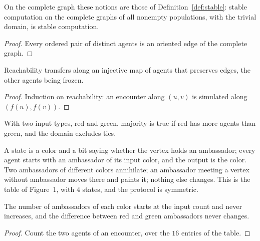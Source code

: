\begin{lemma}\label{lem:graph-top}
\leanok{}
On the complete graph these notions are those of Definition~\ref{def:stable}: stable
computation on the complete graphs of all nonempty populations, with the trivial domain, is
stable computation.
\end{lemma}
\begin{proof}\leanok
Every ordered pair of distinct agents is an oriented edge of the complete graph.
\end{proof}

\begin{lemma}\label{lem:graph-extend}
\leanok{}
Reachability transfers along an injective map of agents that preserves edges, the other agents
being frozen.
\end{lemma}
\begin{proof}\leanok
Induction on reachability: an encounter along $(u, v)$ is simulated along $(f(u), f(v))$.
\end{proof}

\begin{definition}[Majority]\label{def:majority}
\leanok{}
With two input types, red and green, majority is true if red has more agents than green, and the
domain excludes ties.
\end{definition}

\begin{definition}\label{def:ambassador}
\leanok{}
A state is a color and a bit saying whether the vertex holds an ambassador; every agent starts
with an ambassador of its input color, and the output is the color. Two ambassadors of different
colors annihilate; an ambassador meeting a vertex without ambassador moves there and paints it;
nothing else changes. This is the table of Figure~1, with $4$ states, and the protocol is
symmetric.
\end{definition}

\begin{lemma}[Invariants]\label{lem:amb-invariant}
\leanok{}
The number of ambassadors of each color starts at the input count and never increases, and the
difference between red and green ambassadors never changes.
\end{lemma}
\begin{proof}\leanok
Count the two agents of an encounter, over the $16$ entries of the table.
\end{proof}

